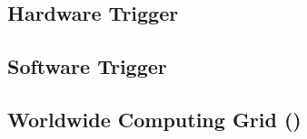 \subsection{Hardware Trigger}

\subsection{Software Trigger}

\subsection{Worldwide \LHC Computing Grid (\WLCG)}

